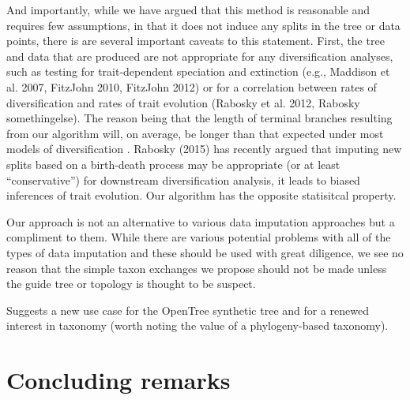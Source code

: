 \documentclass[a4paper,11pt]{article}
\begin{document}
And importantly, while we have argued that this method is reasonable and requires few assumptions, in that it does not induce any splits in the tree or data points, there is are several important caveats to this statement. First, the tree and data that are produced are not appropriate for any diversification analyses, such as testing for trait-dependent speciation and extinction (e.g., Maddison et al. 2007, FitzJohn 2010, FitzJohn 2012) or for a correlation between rates of diversification and rates of trait evolution (Rabosky et al. 2012, Rabosky somethingelse). The reason being that the length of terminal branches resulting from our algorithm will, on average, be longer than that expected under most models of diversification \citep[see][]{Stadler2013}. Rabosky (2015) has recently argued that imputing new splits based on a birth-death process may be appropriate (or at least ``conservative'') for downstream diversification analysis, it leads to biased inferences of trait evolution. Our algorithm has the opposite statisitcal property. 

Our approach is not an alternative to various data imputation approaches but a compliment to them. While there are various potential problems with all of the types of data imputation and these should be used with great diligence, we see no reason that the simple taxon exchanges we propose should not be made unless the guide tree or topology is thought to be suspect.

Suggests a new use case for the OpenTree synthetic tree and for a renewed interest in taxonomy (worth noting the value of a phylogeny-based taxonomy).

\section{Concluding remarks}

\clearpage


\end{document}
